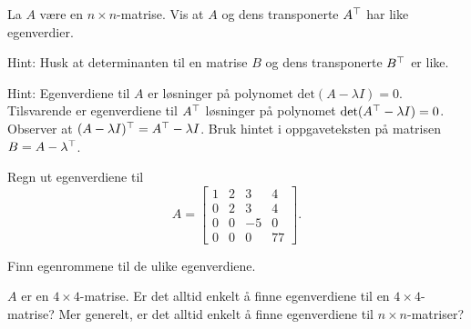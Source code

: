\begin{oppgave}
La $A$ være en $n\times n$-matrise. Vis at $A$ og dens transponerte $A^\top$ har like egenverdier.

\noindent
Hint: Husk at determinanten til en matrise $B$ og dens transponerte $B^\top$ er like.
\end{oppgave}

\begin{losning}
Hint: Egenverdiene til $A$ er løsninger på polynomet $\text{det}(A-\lambda I)=0$. Tilsvarende er egenverdiene til $A^\top$ løsninger på polynomet $\text{det}(A^\top-\lambda I)=0$. Observer at $(A-\lambda I)^\top=A^\top-\lambda I$. Bruk hintet i oppgaveteksten på matrisen $B=A-\lambda^\top$.
\end{losning}



\begin{oppgave}
\begin{punkt}
Regn ut egenverdiene til $$A=\begin{bmatrix}
1 & 2 & 3 & 4\\
0 & 2 & 3 & 4\\
0 & 0 & -5 & 0\\
0 & 0 & 0 & 77
\end{bmatrix}.
$$

\end{punkt}

\begin{punkt}
Finn egenrommene til de ulike egenverdiene.
\end{punkt}

\begin{punkt}
$A$ er en $4\times 4$-matrise. Er det alltid enkelt å finne egenverdiene til en $4\times 4$-matrise? Mer generelt, er det alltid enkelt å finne egenverdiene til $n\times n$-matriser?
\end{punkt}

\end{oppgave}


